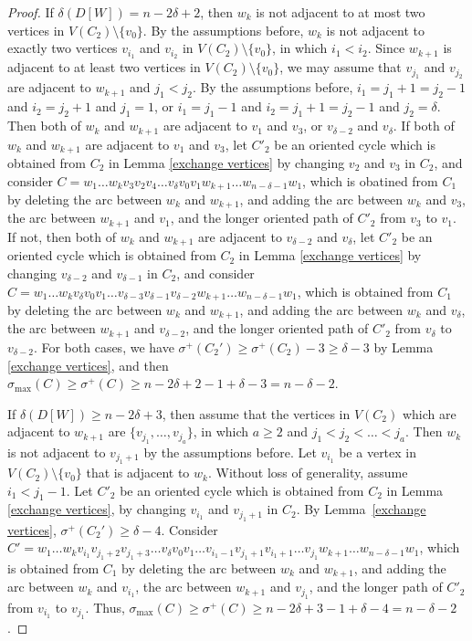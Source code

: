 \documentclass[11pt]{article}
\newcommand{\QGr}[1]{{#1}}
\newcommand{\2}{\vspace{0.2cm}}
\begin{document}
\begin{proof}
   If $\delta(D[W])= n-2\delta+2$, then $w_k$ is not adjacent to at most two vertices in $V(C_2)\setminus\{v_0\}$. By the assumptions before, $w_k$ is not adjacent to exactly two vertices $v_{i_1}$ and $v_{i_2}$ in $V(C_2)\setminus\{v_0\}$, in which $i_1<i_2$. Since $w_{k+1}$ is adjacent to at least two vertices in $V(C_2)\setminus\{v_0\}$, we may assume that $v_{j_1}$ and $v_{j_2}$ are adjacent to $w_{k+1}$ and $j_1<j_2$. By the assumptions before, $i_1=j_1+1=j_2-1$ and $i_2=j_2+1$ and $j_1=1$, or $i_1=j_1-1$ and $i_2=j_1+1=j_2-1$ and $j_2=\delta$. Then both of $w_k$ and $w_{k+1}$ are adjacent to $v_1$ and $v_3$, or $v_{\delta-2}$ and $v_{\delta}$. \QGr{If both of $w_k$ and $w_{k+1}$ are adjacent to $v_1$ and $v_3$, let $C'_2$ be an oriented cycle which is obtained from $C_2$ in Lemma \ref{exchange vertices} by changing $v_2$ and $v_3$ in $C_2$, and} consider $C = w_1\ldots w_k v_3v_2v_4 \ldots v_{\delta} v_0 v_1w_{k+1} \ldots w_{n-\delta-1}w_1$, which is obatined from $C_1$ by deleting the arc between $w_k$ and $w_{k+1}$, and adding the arc between $w_k$ and $v_3$, the arc between $w_{k+1}$ and $v_1$, and the longer oriented path of $C'_2$ from $v_3$ to $v_1$. \QGr{If not, then both of $w_k$ and $w_{k+1}$ are adjacent to $v_{\delta-2}$ and $v_{\delta}$, let $C'_2$ be an oriented cycle which is obtained from $C_2$ in Lemma \ref{exchange vertices} by changing $v_{\delta-2}$ and $v_{\delta-1}$ in $C_2$, and} consider $C = w_1\ldots w_k v_{\delta} v_0 v_1 \ldots v_{\delta-3}v_{\delta-1}v_{\delta-2} w_{k+1} \ldots w_{n-\delta-1}w_1$, which is obtained from $C_1$ by deleting the arc between $w_k$ and $w_{k+1}$, and adding the arc between $w_k$ and $v_{\delta}$, the arc between $w_{k+1}$ and $v_{\delta-2}$, and the longer oriented path of $C'_2$ from $v_{\delta}$ to $v_{\delta-2}$. \QGr{For both cases, we have $\sigma^+(C_2')\ge \sigma^+(C_2)-3\ge \delta - 3$ by Lemma \ref{exchange vertices}, and then} $\sigma_{\max}(C) \ge \sigma^+(C)\ge n-2\delta +2 - 1 + \delta -3=n-\delta -2$.

   If $\delta(D[W])\ge n-2\delta+3$, then assume that the vertices in $V(C_2)$ which are adjacent to $w_{k+1}$ are $\{v_{j_1},\ldots,v_{j_a}\}$, in which $a \ge 2$ and $j_1<j_2<\dots<j_a$. Then $w_k$ is not adjacent to $v_{j_1+1}$ by the assumptions before. Let $v_{i_1}$ be a vertex in $V(C_2)\setminus \{v_0\}$ that is adjacent to $w_k$. Without loss of generality, assume $i_1< j_1-1$. Let $C'_2$ be an oriented cycle which is obtained from $C_2$ in Lemma \ref{exchange vertices}, by changing $v_{i_1}$ and $v_{j_1+1}$ in $C_2$. By Lemma~\ref{exchange vertices}, $\sigma^+(C_2')\ge \delta - 4$. Consider $C' = w_1\ldots w_k v_{i_1}v_{j_1+2}v_{j_1+3}\dots v_{\delta}v_0v_1\dots v_{i_1-1}v_{j_1+1}v_{i_1+1}\ldots v_{j_1} w_{k+1} \ldots w_{n-\delta-1}w_1$,  which is obtained from $C_1$ by deleting the arc between $w_k$ and $w_{k+1}$, and adding the arc between $w_k$ and $v_{i_1}$, the arc between $w_{k+1}$ and $v_{j_1}$, and the longer path of $C'_2$ from $v_{i_1}$ to $v_{j_1}$. Thus, $\sigma_{\max}(C) \ge \sigma^+(C)\ge n-2\delta +3 - 1 + \delta -4=n-\delta -2$.
     \end{proof}
\end{document}
